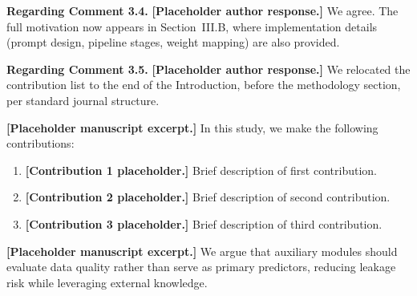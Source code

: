 \begin{refsegment}
\begin{authorresponse}
\noindent\textbf{Regarding Comment 3.4.}
\textbf{[Placeholder author response.]} We agree. The full motivation now appears in Section~III.B, where implementation details (prompt design, pipeline stages, weight mapping) are also provided.

\SplitChangeSection

\noindent\textbf{Regarding Comment 3.5.}
\textbf{[Placeholder author response.]} We relocated the contribution list to the end of the Introduction, before the methodology section, per standard journal structure.
\end{authorresponse}

\begin{authorchange}

\textbf{[Placeholder manuscript excerpt.]} In this study, we make the following contributions:
\begin{enumerate}
    \item \textbf{[Contribution 1 placeholder.]} Brief description of first contribution.
    \item \textbf{[Contribution 2 placeholder.]} Brief description of second contribution.
    \item \textbf{[Contribution 3 placeholder.]} Brief description of third contribution.
\end{enumerate}

\SplitChangeSection


\textbf{[Placeholder manuscript excerpt.]} We argue that auxiliary modules should evaluate data quality rather than serve as primary predictors, reducing leakage risk while leveraging external knowledge.
\end{authorchange}
\RRSectionBibliography
\end{refsegment}
